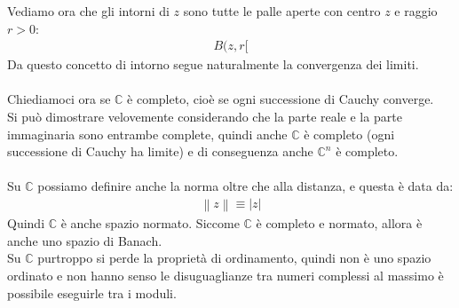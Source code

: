 \documentclass[a4paper, oneside]{article}
\begin{document}
    Vediamo ora che gli intorni di $z$ sono tutte le palle aperte con centro $z$ e raggio $r > 0$:
    \begin{gather*}
        B(z, r[
    \end{gather*}
    Da questo concetto di intorno segue naturalmente la convergenza dei limiti.\\
    \hfill\\
    Chiediamoci ora se $\mathbb{C}$ è completo, cioè se ogni successione di Cauchy converge.\\
    Si può dimostrare velovemente considerando che la parte reale e la parte immaginaria sono entrambe complete, quindi anche $\mathbb{C}$ è completo (ogni successione di Cauchy ha limite) e di conseguenza anche $\mathbb{C}^n$ è completo.\\
    \hfill\\
    Su $\mathbb{C}$ possiamo definire anche la norma oltre che alla distanza, e questa è data da:
    \begin{gather*}
        \left\lVert z \right\rVert  \equiv |z|
    \end{gather*}
    Quindi $\mathbb{C}$ è anche spazio normato.
    Siccome $\mathbb{C}$ è completo e normato, allora è anche uno spazio di Banach.\\
    Su $\mathbb{C}$ purtroppo si perde la proprietà di ordinamento, quindi non è uno spazio ordinato e non hanno senso le disuguaglianze tra numeri complessi al massimo è possibile eseguirle tra i moduli.\\ 
\end{document}
